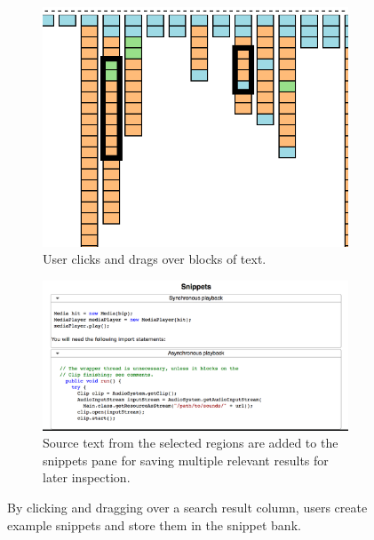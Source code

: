 \begin{figure}
    \centering
    \begin{subfigure}[b]{0.8\columnwidth}
        \includegraphics[width=\textwidth]{figures/selection_regions}
        \caption{User clicks and drags over blocks of text.}
        \label{fig:selection_regions}
    \end{subfigure}
    \bigskip
    \begin{subfigure}[b]{0.9\columnwidth}
        \includegraphics[width=\textwidth]{figures/snippets}
        \caption{Source text from the selected regions are added to the snippets pane for saving multiple relevant results for later inspection.}
        \label{fig:snippets}
    \end{subfigure}
    \caption{By clicking and dragging over a search result column, users create example snippets and store them in the snippet bank.}
\end{figure}

